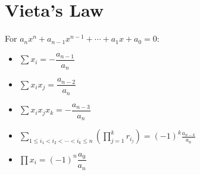\section{Vieta's Law}
For $a_{n}x^{n}+a_{n-1}x^{n-1}+\cdots +a_{1}x+a_{0}=0$:
\begin{itemize}
	\item $\sum x_i=-\dfrac{a_{n-1}}{a_n}$
	\item $\sum x_ix_j=\dfrac{a_{n-2}}{a_n}$
	\item $\sum x_ix_jx_k = -\dfrac{a_{n-3}}{a_n}$
	\item $\sum _{1\leq i_{1}<i_{2}<\cdots <i_{k}\leq n}\left(\prod _{j=1}^{k}r_{i_{j}}\right)=(-1)^{k}{\frac {a_{n-k}}{a_{n}}}$
	\item $\prod x_i=(-1)^n\dfrac{a_0}{a_n}$
\end{itemize}